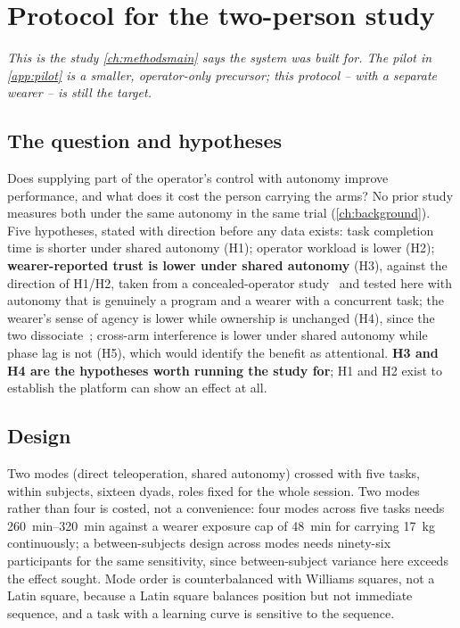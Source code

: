 \chapter{Protocol for the two-person study}
\label{app:study}
\label{ch:study}

\noindent\emph{This is the study \cref{ch:methodsmain} says the system was
built for. The pilot in \cref{app:pilot} is a smaller, operator-only
precursor; this protocol -- with a separate wearer -- is still the target.}

\section{The question and hypotheses}

Does supplying part of the operator's control with autonomy improve
performance, and what does it cost the person carrying the arms? No prior
study measures both under the same autonomy in the same trial
(\cref{ch:background}). Five hypotheses, stated with direction before any
data exists: task completion time is shorter under shared autonomy (H1);
operator workload is lower (H2); \textbf{wearer-reported trust is lower
under shared autonomy} (H3), against the direction of H1/H2, taken from a
concealed-operator study~\cite{zhou2026proxemics} and tested here with
autonomy that is genuinely a program and a wearer with a concurrent task;
the wearer's sense of agency is lower while ownership is unchanged (H4),
since the two dissociate~\cite{longo2008embodiment}; cross-arm interference
is lower under shared autonomy while phase lag is not (H5), which would
identify the benefit as attentional. \textbf{H3 and H4 are the hypotheses
worth running the study for}; H1 and H2 exist to establish the platform can
show an effect at all.

\section{Design}

Two modes (direct teleoperation, shared autonomy) crossed with five tasks,
within subjects, sixteen dyads, roles fixed for the whole session. Two modes
rather than four is costed, not a convenience: four modes across five tasks
needs \SIrange{260}{320}{\minute} against a wearer exposure cap of
\SI{48}{\minute} for carrying \SI{17}{\kilo\gram} continuously; a
between-subjects design across modes needs ninety-six participants for the
same sensitivity, since between-subject variance here exceeds the effect
sought. Mode order is counterbalanced with Williams squares, not a Latin
square, because a Latin square balances position but not immediate sequence,
and a task with a learning curve is sensitive to the sequence.

